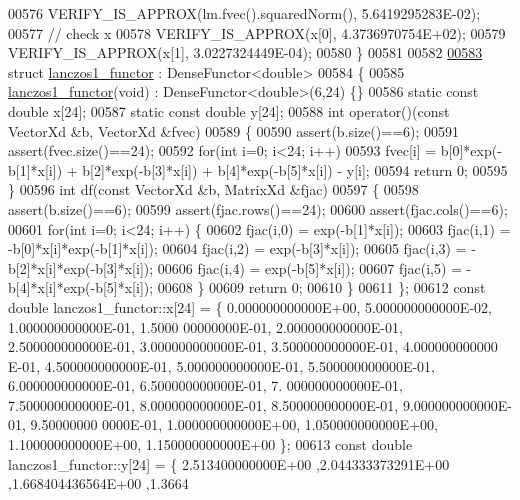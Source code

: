 \begin{DoxyCode}
00576   VERIFY\_IS\_APPROX(lm.fvec().squaredNorm(), 5.6419295283E-02);
00577   \textcolor{comment}{// check x}
00578   VERIFY\_IS\_APPROX(x[0], 4.3736970754E+02);
00579   VERIFY\_IS\_APPROX(x[1], 3.0227324449E-04);
00580 \}
00581 
00582 
\hyperlink{structlanczos1__functor}{00583} \textcolor{keyword}{struct }\hyperlink{structlanczos1__functor}{lanczos1\_functor} : DenseFunctor<double>
00584 \{
00585     \hyperlink{structlanczos1__functor}{lanczos1\_functor}(\textcolor{keywordtype}{void}) : DenseFunctor<double>(6,24) \{\}
00586     \textcolor{keyword}{static} \textcolor{keyword}{const} \textcolor{keywordtype}{double} x[24];
00587     \textcolor{keyword}{static} \textcolor{keyword}{const} \textcolor{keywordtype}{double} y[24];
00588     \textcolor{keywordtype}{int} operator()(\textcolor{keyword}{const} VectorXd &b, VectorXd &fvec)
00589     \{
00590         assert(b.size()==6);
00591         assert(fvec.size()==24);
00592         \textcolor{keywordflow}{for}(\textcolor{keywordtype}{int} i=0; i<24; i++)
00593             fvec[i] = b[0]*exp(-b[1]*x[i]) + b[2]*exp(-b[3]*x[i]) + b[4]*exp(-b[5]*x[i])  - y[i];
00594         \textcolor{keywordflow}{return} 0;
00595     \}
00596     \textcolor{keywordtype}{int} df(\textcolor{keyword}{const} VectorXd &b, MatrixXd &fjac)
00597     \{
00598         assert(b.size()==6);
00599         assert(fjac.rows()==24);
00600         assert(fjac.cols()==6);
00601         \textcolor{keywordflow}{for}(\textcolor{keywordtype}{int} i=0; i<24; i++) \{
00602             fjac(i,0) = exp(-b[1]*x[i]);
00603             fjac(i,1) = -b[0]*x[i]*exp(-b[1]*x[i]);
00604             fjac(i,2) = exp(-b[3]*x[i]);
00605             fjac(i,3) = -b[2]*x[i]*exp(-b[3]*x[i]);
00606             fjac(i,4) = exp(-b[5]*x[i]);
00607             fjac(i,5) = -b[4]*x[i]*exp(-b[5]*x[i]);
00608         \}
00609         \textcolor{keywordflow}{return} 0;
00610     \}
00611 \};
00612 \textcolor{keyword}{const} \textcolor{keywordtype}{double} lanczos1\_functor::x[24] = \{ 0.000000000000E+00, 5.000000000000E-02, 1.000000000000E-01, 1.5000
      00000000E-01, 2.000000000000E-01, 2.500000000000E-01, 3.000000000000E-01, 3.500000000000E-01, 4.000000000000
      E-01, 4.500000000000E-01, 5.000000000000E-01, 5.500000000000E-01, 6.000000000000E-01, 6.500000000000E-01, 7.
      000000000000E-01, 7.500000000000E-01, 8.000000000000E-01, 8.500000000000E-01, 9.000000000000E-01, 9.50000000
      0000E-01, 1.000000000000E+00, 1.050000000000E+00, 1.100000000000E+00, 1.150000000000E+00 \};
00613 \textcolor{keyword}{const} \textcolor{keywordtype}{double} lanczos1\_functor::y[24] = \{ 2.513400000000E+00 ,2.044333373291E+00 ,1.668404436564E+00 ,1.3664

\end{DoxyCode}
